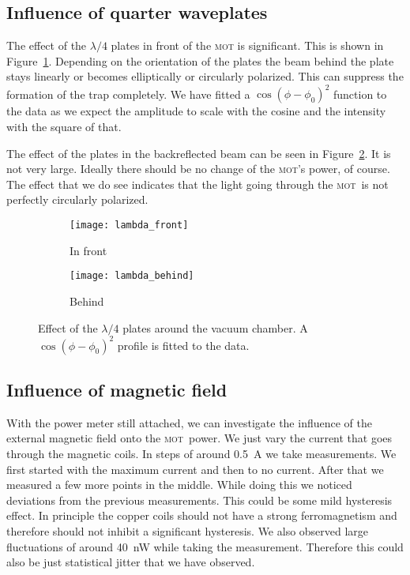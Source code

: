 \documentclass[11pt, english, fleqn, DIV=15, headinclude, BCOR=2cm]{scrreprt}
\newcommand\mot{\textsc{mot}}
\begin{document}

\subsection{Influence of quarter waveplates}

The effect of the $\lambda/4$ plates in front of the \mot{} is significant.
This is shown in Figure~\ref{fig:lambda_front}. Depending on the orientation of
the plates the beam behind the plate stays linearly or becomes elliptically or
circularly polarized. This can suppress the formation of the trap completely.
We have fitted a $\cos(\phi - \phi_0)^2$ function to the data as we expect the
amplitude to scale with the cosine and the intensity with the square of that.

The effect of the plates in the backreflected beam can be seen in
Figure~\ref{fig:lambda_behind}. It is not very large. Ideally there should be
no change of the \mot's power, of course. The effect that we do see indicates
that the light going through the \mot\ is not perfectly circularly polarized.

\begin{figure}
    \centering
    \begin{subfigure}[c]{0.48\linewidth}
    \centering
    \texttt{[image: lambda\_front]}
    \caption{%
        In front
    }
    \label{fig:lambda_front}
    \end{subfigure}
    \hfill
    \begin{subfigure}[c]{0.48\linewidth}
    \centering
    \texttt{[image: lambda\_behind]}
    \caption{%
        Behind
    }
    \label{fig:lambda_behind}
    \end{subfigure}
    \caption{%
        Effect of the $\lambda/4$ plates around the vacuum chamber.
        A $\cos(\phi - \phi_0)^2$ profile is fitted to the data.
    }
    \label{fig:}
\end{figure}

\subsection{Influence of magnetic field}

With the power meter still attached, we can investigate the influence of the
external magnetic field onto the \mot\ power. We just vary the current that
goes through the magnetic coils. In steps of around \SI{0.5}{\ampere} we take
measurements. We first started with the maximum current and then to no current.
After that we measured a few more points in the middle. While doing this we
noticed deviations from the previous measurements. This could be some mild
hysteresis effect. In principle the copper coils should not have a strong
ferromagnetism and therefore should not inhibit a significant hysteresis. We
also observed large fluctuations of around \SI{40}{\nano\watt} while taking the
measurement. Therefore this could also be just statistical jitter that we have
observed.
\end{document}
